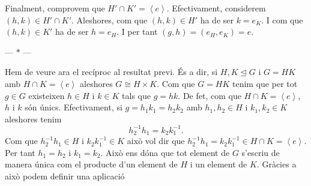 \documentclass[12pt]{article}
\newcommand{\gen}[1]{\left\langle #1 \right\rangle}
\newcommand{\normal}{\trianglelefteq}
\newcommand{\parbreak}{
	\begin{center}
		--- $\ast$ ---
	\end{center} 
}
\begin{document}
Finalment, comprovem que \( H' \cap K' = \gen{e} \). Efectivament, considerem \( (h,k) \in H' \cap K' \). Aleshores, com que \( (h,k) \in H' \) ha de ser \( k = e_K \). I com que \( (h,k) \in K' \) ha de ser \( h = e_H \). I per tant \( (g,h) = (e_H, e_K) = e \).

\parbreak

Hem de veure ara el recíproc al resultat previ. És a dir, si \( H,K \normal G \) i \( G = HK \) amb \( H \cap K = \gen{e} \) aleshores \( G \cong H \times K \). Com que \( G = HK \) tenim que per tot \( g \in G \) existeixen \( h\in H \) i \( k \in K \) tals que \( g= hk \). De fet, com que \( H \cap K = \gen{e} \), \( h \) i \( k \) són únics. Efectivament, si \( g = h_1k_1 = h_2k_2 \) amb \( h_1,h_2 \in H \) i \( k_1,k_2 \in K \) aleshores tenim  
\begin{equation*}
h_2^{-1}h_1 = k_2k_1^{-1}.
\end{equation*}
Com que \( h_2^{-1}h_1 \in H \) i \( k_2k_1^{-1} \in K \) això vol dir que \( h_2^{-1}h_1 = k_2k_1^{-1} \in H \cap K = \gen{e} \). Per tant \( h_1 = h_2 \) i \( k_1 = k_2 \). Això ens dóna que tot element de \( G \) s'escriu de manera única com el producte d'un element de \( H \) i un element de \( K \). Gràcies a això podem definir una aplicació 
\begin{align*}

\end{align*}
\end{document}
